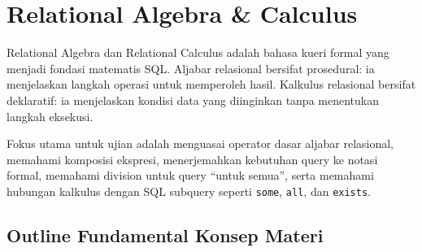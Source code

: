 \section{Relational Algebra \& Calculus}

Relational Algebra dan Relational Calculus adalah bahasa kueri formal yang menjadi fondasi matematis SQL. Aljabar relasional bersifat prosedural: ia menjelaskan langkah operasi untuk memperoleh hasil. Kalkulus relasional bersifat deklaratif: ia menjelaskan kondisi data yang diinginkan tanpa menentukan langkah eksekusi.

Fokus utama untuk ujian adalah menguasai operator dasar aljabar relasional, memahami komposisi ekspresi, menerjemahkan kebutuhan query ke notasi formal, memahami division untuk query ``untuk semua'', serta memahami hubungan kalkulus dengan SQL subquery seperti \texttt{some}, \texttt{all}, dan \texttt{exists}.

\subsection{Outline Fundamental Konsep Materi}

